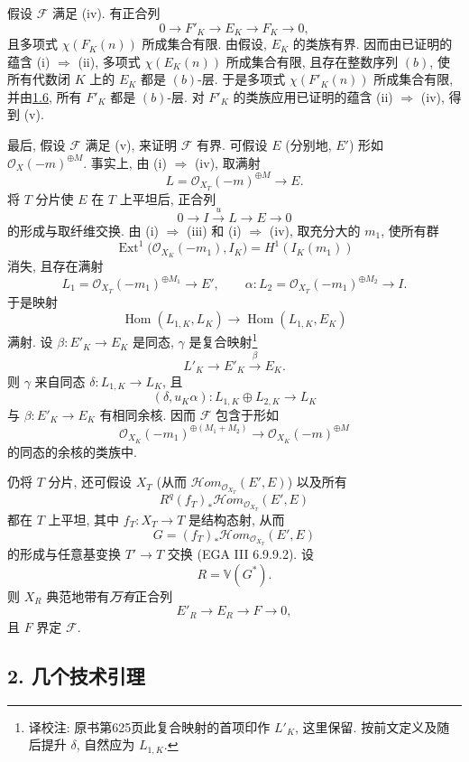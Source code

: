 假设 \(\mathcal F\) 满足 (iv). 有正合列
\[
0\longrightarrow F'_K\longrightarrow E_K\longrightarrow F_K
\longrightarrow0,
\]
且多项式 \(\chi(F_K(n))\) 所成集合有限. 由假设, \(E_K\) 的类族有界. 因而由已证明的蕴含 (i) \(\Rightarrow\) (ii), 多项式 \(\chi(E_K(n))\) 所成集合有限, 且存在整数序列 \((b)\), 使所有代数闭 \(K\) 上的 \(E_K\) 都是 \((b)\)-层. 于是多项式 \(\chi(F'_K(n))\) 所成集合有限, 并由\hyperlink{sga6.e13.prop.1-6}{1.6}, 所有 \(F'_K\) 都是 \((b)\)-层. 对 \(F'_K\) 的类族应用已证明的蕴含 (ii) \(\Rightarrow\) (iv), 得到 (v).

最后, 假设 \(\mathcal F\) 满足 (v), 来证明 \(\mathcal F\) 有界. 可假设 \(E\) (分别地, \(E'\)) 形如 \(\mathcal O_X(-m)^{\oplus M}\). 事实上, 由 (i) \(\Rightarrow\) (iv), 取满射
\[
L=\mathcal O_{X_T}(-m)^{\oplus M}\longrightarrow E.
\]
将 \(T\) 分片使 \(E\) 在 \(T\) 上平坦后, 正合列
\[
0\longrightarrow I\xrightarrow{u}L\longrightarrow E\longrightarrow0
\]
的形成与取纤维交换. 由 (i) \(\Rightarrow\) (iii) 和 (i) \(\Rightarrow\) (iv), 取充分大的 \(m_1\), 使所有群
\[
\operatorname{Ext}^1\bigl(\mathcal O_{X_K}(-m_1),I_K\bigr)
=H^1(I_K(m_1))
\]
消失, 且存在满射
\[
L_1=\mathcal O_{X_T}(-m_1)^{\oplus M_1}\longrightarrow E',
\qquad
\alpha:L_2=\mathcal O_{X_T}(-m_1)^{\oplus M_2}\longrightarrow I.
\]
于是映射
\[
\operatorname{Hom}(L_{1,K},L_K)\longrightarrow
\operatorname{Hom}(L_{1,K},E_K)
\]
满射. 设 \(\beta:E'_K\to E_K\) 是同态, \(\gamma\) 是复合映射\footnote{译校注: 原书第625页此复合映射的首项印作 $L'_K$, 这里保留. 按前文定义及随后提升 $\delta$, 自然应为 $L_{1,K}$.}
\[
L'_K\longrightarrow E'_K\xrightarrow{\beta}E_K.
\]
则 \(\gamma\) 来自同态 \(\delta:L_{1,K}\to L_K\), 且
\[
(\delta,u_K\alpha):L_{1,K}\oplus L_{2,K}\longrightarrow L_K
\]
与 \(\beta:E'_K\to E_K\) 有相同余核. 因而 \(\mathcal F\) 包含于形如
\[
\mathcal O_{X_K}(-m_1)^{\oplus(M_1+M_2)}
\longrightarrow
\mathcal O_{X_K}(-m)^{\oplus M}
\]
的同态的余核的类族中.

仍将 \(T\) 分片, 还可假设 \(X_T\) (从而 \(\mathcal H\!om_{\mathcal O_{X_T}}(E',E)\)) 以及所有
\[
R^q(f_T)_*\mathcal H\!om_{\mathcal O_{X_T}}(E',E)
\]
都在 \(T\) 上平坦, 其中 \(f_T:X_T\to T\) 是结构态射, 从而
\[
G=(f_T)_*\mathcal H\!om_{\mathcal O_{X_T}}(E',E)
\]
的形成与任意基变换 \(T'\to T\) 交换 (EGA III 6.9.9.2). 设
\[
R=\mathbb V(G^*).
\]
则 \(X_R\) 典范地带有\emph{万有}正合列
\[
E'_R\longrightarrow E_R\longrightarrow F\longrightarrow0,
\]
且 \(F\) 界定 \(\mathcal F\).

\subsection*{2. 几个技术引理}

